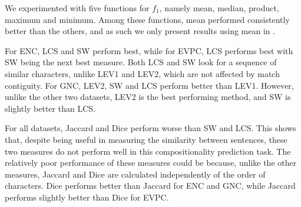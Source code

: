 \documentclass[output=paper
,modfonts
,nonflat]{langsci/langscibook}
\begin{document}
We experimented with five functions for $f_1$, namely mean, median,
product, maximum and minimum. Among these functions, mean performed
consistently better than the others, and as such we only present results
using mean in .



For ENC, LCS and SW perform best, while for EVPC, LCS performs best
with SW being the next best measure. Both LCS and
SW look for a sequence of similar characters, unlike LEV1 and LEV2, 
which are not affected by match contiguity. For GNC, LEV2, SW and LCS
perform better than LEV1. However, unlike the other two datasets, LEV2
is the best performing method, and SW is slightly better than LCS.

For all datasets, Jaccard and Dice perform worse than SW and LCS. This
shows that, despite being useful in measuring the similarity between
sentences, these two measures do not perform well in this
compositionality prediction task. The relatively poor performance of
these measures could be because, unlike the other measures, Jaccard and
Dice are calculated independently of the order of characters. Dice
performs better than Jaccard for ENC and GNC, while Jaccard performs
slightly better than Dice for EVPC. 
\end{document}
